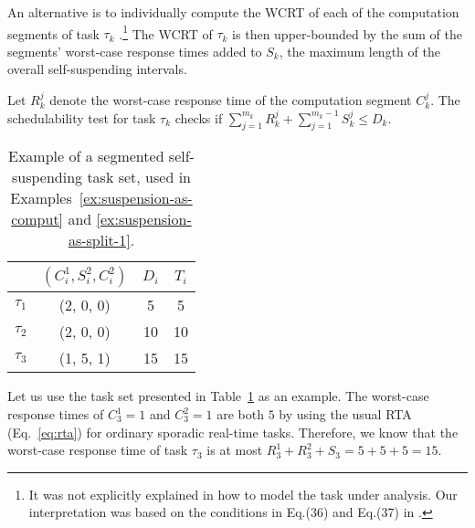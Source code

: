 
\label{sec:model-interferred:split}

An alternative is to individually compute the WCRT of each of the computation segments of task $\tau_k$ \cite{bletsas:thesis,PH:rtss98,Huang:multiseg}.\footnote{\label{footnote-rtss98}It was not explicitly explained in \cite{PH:rtss98} how to model the task under analysis. Our interpretation was based on the conditions in Eq.(36) and Eq.(37) in \cite{PH:rtss98}.}
The WCRT of $\tau_k$ is then upper-bounded by the sum of the segments' worst-case response times added to $S_k$, the maximum length of the overall
self-suspending intervals. 
 
Let $R_k^j$ denote the worst-case response time of the computation segment $C_k^j$. The schedulability test for task $\tau_k$ checks if $\sum_{j=1}^{m_k} R_k^j + \sum_{j=1}^{m_k-1} S_k^j \leq D_k $. 

\begin{table}[t]
\centering
    \begin{tabular}{|c|c|c|c|}
 \hline
        & $(C_i^1, S_i^2, C_i^2)$ &  $D_i$ & $T_i$\\ 
        \hline
        $\tau_1$ & (2, 0, 0) &  5 & 5\\ 
        $\tau_2$ &  (2, 0, 0) & 10 & 10 \\ 
        $\tau_3$ & (1, 5, 1) & 15  & 15\\
        \hline
    \end{tabular} 
    \caption{Example of a segmented self-suspending task set, used in Examples~\ref{ex:suspension-as-comput} and \ref{ex:suspension-as-split-1}.}
    \label{table:static-example}
\end{table}

\begin{example}
\label{ex:suspension-as-split-1}   
Let us use the task set presented in Table~\ref{table:static-example} as an example. The worst-case response times of $C_3^1=1$ and $C_3^2=1$ are both $5$ by using the usual RTA (Eq.~\eqref{eq:rta}) for ordinary sporadic real-time tasks. Therefore, we know that the worst-case response time of task $\tau_3$ is at most $R_3^1 + R_3^2 + S_3 = 5 + 5 + 5 = 15$.
\hfill\myendproof  
\end{example}

